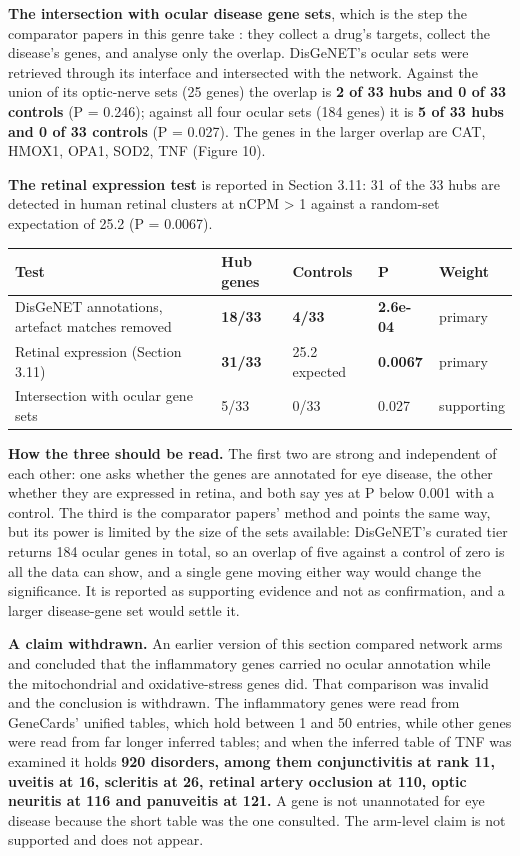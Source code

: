 \documentclass[utf8]{FrontiersinVancouver}
\begin{document}
\textbf{The intersection with ocular disease gene sets}, which is the step the comparator papers in this genre take \citep{f2026}: they collect a drug's targets, collect the disease's genes, and analyse only the overlap. DisGeNET's ocular sets were retrieved through its interface and intersected with the network. Against the union of its optic-nerve sets (25 genes) the overlap is \textbf{2 of 33 hubs and 0 of 33 controls} (P = 0.246); against all four ocular sets (184 genes) it is \textbf{5 of 33 hubs and 0 of 33 controls} (P = 0.027). The genes in the larger overlap are CAT, HMOX1, OPA1, SOD2, TNF (Figure 10).

\textbf{The retinal expression test} is reported in Section 3.11: 31 of the 33 hubs are detected in human retinal clusters at nCPM > 1 against a random-set expectation of 25.2 (P = 0.0067).

\begin{table}[htbp]
\centering
\begin{tabular}{lllll}
\hline
Test & Hub genes & Controls & P & Weight \\
\hline
DisGeNET annotations, artefact matches removed & \textbf{18/33} & \textbf{4/33} & \textbf{2.6e-04} & primary \\
Retinal expression (Section 3.11) & \textbf{31/33} & 25.2 expected & \textbf{0.0067} & primary \\
Intersection with ocular gene sets & 5/33 & 0/33 & 0.027 & supporting \\
\hline
\end{tabular}
\end{table}

\textbf{How the three should be read.} The first two are strong and independent of each other: one asks whether the genes are annotated for eye disease, the other whether they are expressed in retina, and both say yes at P below 0.001 with a control. The third is the comparator papers' method and points the same way, but its power is limited by the size of the sets available: DisGeNET's curated tier returns 184 ocular genes in total, so an overlap of five against a control of zero is all the data can show, and a single gene moving either way would change the significance. It is reported as supporting evidence and not as confirmation, and a larger disease-gene set would settle it.

\textbf{A claim withdrawn.} An earlier version of this section compared network arms and concluded that the inflammatory genes carried no ocular annotation while the mitochondrial and oxidative-stress genes did. That comparison was invalid and the conclusion is withdrawn. The inflammatory genes were read from GeneCards' unified tables, which hold between 1 and 50 entries, while other genes were read from far longer inferred tables; and when the inferred table of TNF was examined it holds \textbf{920 disorders, among them conjunctivitis at rank 11, uveitis at 16, scleritis at 26, retinal artery occlusion at 110, optic neuritis at 116 and panuveitis at 121.} A gene is not unannotated for eye disease because the short table was the one consulted. The arm-level claim is not supported and does not appear.
\end{document}

